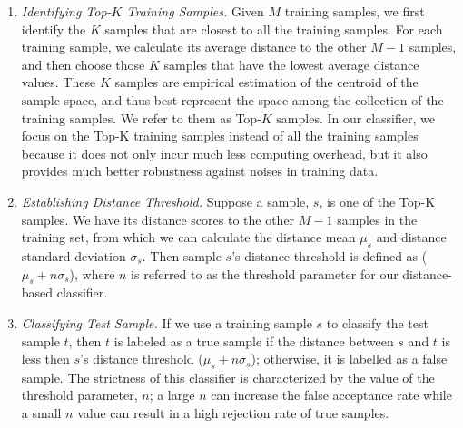 \begin{enumerate}

\vspace{3pt}\item \emph{Identifying Top-$K$ Training Samples.} Given $M$ training samples, we first identify the $K$
samples that are closest to all the training samples. For each training sample, we calculate its average distance to the other $M-1$ samples, and then choose those $K$ samples that have the lowest average distance values. These $K$ samples are empirical estimation of the centroid of the sample space, and thus best represent the space among the collection of the training samples. We refer to them as Top-$K$ samples. In our classifier, we focus on the Top-K training samples instead of all the training samples because it does not only incur much less computing overhead, but it also provides much better robustness against noises in training data.

\vspace{3pt}\item \emph{Establishing Distance Threshold.} Suppose a sample, $s$, is one of the Top-K samples. We have its distance scores to the other $M-1$ samples in the training set, from which we can calculate the distance mean $\mu_s$ and distance standard deviation $\sigma_s$. Then sample $s$'s distance threshold is defined as ($\mu_s+n\sigma_s$), where $n$ is referred to as the threshold parameter for our distance-based classifier.

\vspace{3pt}\item \emph{Classifying Test Sample.}   If we use a training sample $s$ to classify the test sample $t$, then $t$ is labeled as a true sample if the distance between $s$ and $t$ is less then $s$'s distance threshold ($\mu_s+n\sigma_s$); otherwise, it is labelled as a false sample. The strictness of this classifier is characterized by
the value of the threshold parameter, $n$; a large $n$ can increase the false
acceptance rate while a small $n$ value can result in a
high rejection rate of true samples. %


\end{enumerate}
